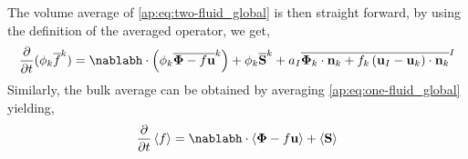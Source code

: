 The volume average of \ref{ap:eq:two-fluid_global} is then straight forward, by using the definition of the averaged operator, we get, 
\begin{equation*}
    \frac{\partial}{\partial t} (\phi_k\kavg{f})
    = \nablabh \cdot \left(
        \phi_k \kavg{\bm{\Phi} - f \textbf{u}}
    \right)
    + \phi_k \kavg{\textbf{S}}
    + a_I \Iavg{
        \bm{\Phi}_k \cdot \textbf{n}_k
        + f_k 
        \left(
            \textbf{u}_I
            - \textbf{u}_k
        \right) \cdot \textbf{n}_k
    } 
\end{equation*}
Similarly, the bulk average can be obtained by averaging \ref{ap:eq:one-fluid_global} yielding, 
\begin{equation*}
    \frac{\partial}{\partial t} \avg{f}
    = \nablabh \cdot \avg{\bm{\Phi} - f \textbf{u}}
    + \avg{\textbf{S}}
    \label{ap:eq:avg_global}
\end{equation*}
